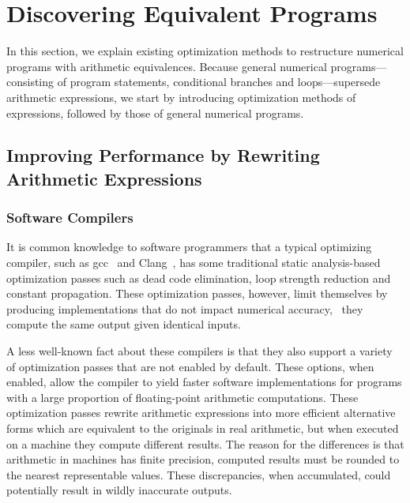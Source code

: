 \section{Discovering Equivalent Programs}
\label{bg:sec:discovering_equivalent_programs}

In this section, we explain existing optimization methods to restructure
numerical programs with arithmetic equivalences.  Because general numerical
programs---consisting of program statements, conditional branches and
loops---supersede arithmetic expressions, we start by introducing optimization
methods of expressions, followed by those of general numerical programs.


\subsection{Improving Performance by Rewriting Arithmetic Expressions}
\label{bg:sub:performance}

\subsubsection{Software Compilers}

It is common knowledge to software programmers that a typical optimizing
compiler, such as \gls{gcc}~\cite{gcc} and Clang~\cite{clang}, has some
traditional static analysis-based optimization passes such as dead code
elimination, loop strength reduction and constant propagation.  These
optimization passes, however, limit themselves by producing implementations
that do not impact numerical accuracy, \ie~they compute the same output given
identical inputs.

A less well-known fact about these compilers is that they also support a
variety of optimization passes that are not enabled by default.  These options,
when enabled, allow the compiler to yield faster software implementations for
programs with a large proportion of floating-point arithmetic computations.
These optimization passes rewrite arithmetic expressions into more efficient
alternative forms which are equivalent to the originals in real arithmetic,
but when executed on a machine they compute different results.  The reason
for the differences is that arithmetic in machines has finite precision,
computed results must be rounded to the nearest representable values.  These
discrepancies, when accumulated, could potentially result in wildly inaccurate
outputs.

